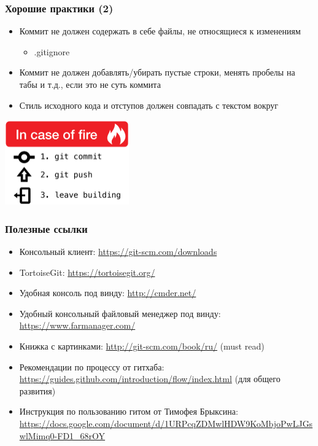 \documentclass[xetex,mathserif,serif]{beamer}
\begin{document}
	\begin{frame}
		\frametitle{Хорошие практики (2)}
		\begin{itemize}
			\item Коммит не должен содержать в себе файлы, не относящиеся к изменениям
			\begin{itemize}
				\item .gitignore
			\end{itemize}
			\item Коммит не должен добавлять/убирать пустые строки, менять пробелы на табы и т.д., если это не суть коммита
			\item Стиль исходного кода и отступов должен совпадать с текстом вокруг
		\end{itemize}
		\begin{center}
			\includegraphics[width=0.4\textwidth]{inCaseOfFire.png}
		\end{center}
	\end{frame}
	
	\begin{frame}
		\frametitle{Полезные ссылки}
		\begin{itemize}
			\item Консольный клиент: \url{https://git-scm.com/downloads}
			\item TortoiseGit: \url{https://tortoisegit.org/}
			\item Удобная консоль под винду: \url{http://cmder.net/}
			\item Удобный консольный файловый менеджер под винду: \url{https://www.farmanager.com/}
			\item Книжка с картинками: \url{http://git-scm.com/book/ru/} (must read)
			\item Рекомендации по процессу от гитхаба: \url{https://guides.github.com/introduction/flow/index.html} (для общего развития)
			\item Инструкция по пользованию гитом от Тимофея Брыксина: \url{https://docs.google.com/document/d/1URPcqZDMwlHDW9KoMbjoPwLJGswlMimq0-FD1_68rOY}
		\end{itemize}
	\end{frame}
\end{document}
